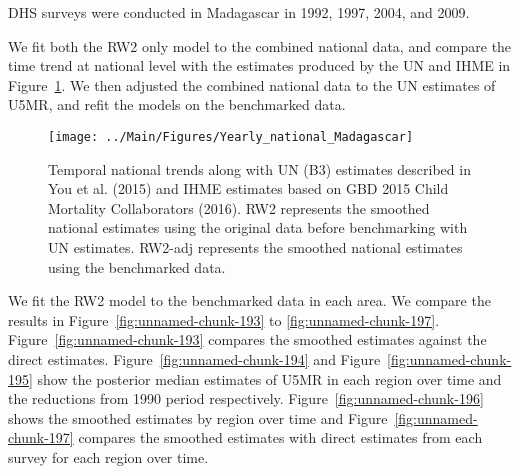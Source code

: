 \documentclass[12pt]{article}\usepackage[]{graphicx}\usepackage[]{color}
\newenvironment{knitrout}{}{} %
\begin{document}


DHS surveys were conducted in Madagascar in 1992, 1997, 2004, and 2009.

We fit both the RW2 only model to the combined national data, and compare the time trend at national level with the estimates produced by the UN and IHME in Figure~\ref{fig:unnamed-chunk-192}. We then adjusted the combined national data to the UN estimates of U5MR, and refit the models on the benchmarked data. 

\begin{knitrout}
\color{fgcolor}\begin{figure}[bht]

{\centering \texttt{[image: ../Main/Figures/Yearly\_national\_Madagascar]} 

}

\caption[Temporal national trends along with UN (B3) estimates described in You et al]{Temporal national trends along with UN (B3) estimates described in You et al. (2015) and IHME estimates based on GBD 2015 Child Mortality Collaborators (2016). RW2 represents the smoothed national estimates using the original data before benchmarking with UN estimates. RW2-adj represents the smoothed national estimates using the benchmarked data.}\label{fig:unnamed-chunk-192}
\end{figure}


\end{knitrout}
 

We fit the RW2 model to the benchmarked data in each area. 
We compare the results in Figure~\ref{fig:unnamed-chunk-193} to \ref{fig:unnamed-chunk-197}.
Figure~\ref{fig:unnamed-chunk-193} compares the smoothed estimates against the direct estimates. Figure~\ref{fig:unnamed-chunk-194} and Figure~\ref{fig:unnamed-chunk-195} show the posterior median estimates of U5MR in each region over time and the reductions from 1990 period respectively.
Figure~\ref{fig:unnamed-chunk-196} shows the smoothed estimates by region over time and Figure~\ref{fig:unnamed-chunk-197} compares the smoothed estimates with direct estimates from each survey for each region over time.


\end{document}
